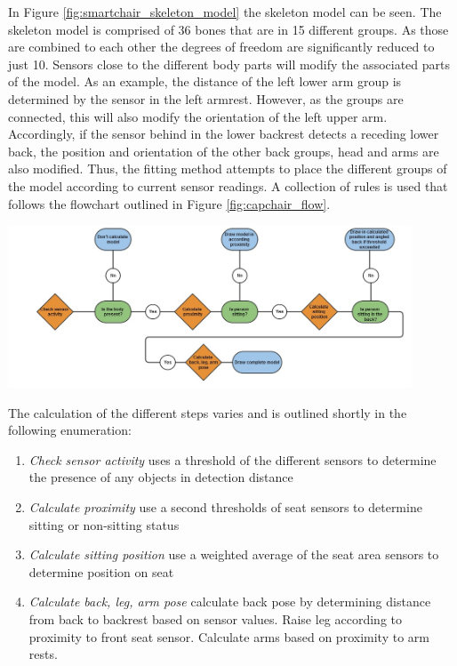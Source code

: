 In Figure \ref{fig:smartchair_skeleton_model} the skeleton model can be seen. The skeleton model is comprised of 36 bones that are in 15 different groups. As those are combined to each other the degrees of freedom are significantly reduced to just 10. Sensors close to the different body parts will modify the associated parts of the model. As an example, the distance of the left lower arm group is determined by the sensor in the left armrest. However, as the groups are connected, this will also modify the orientation of the left upper arm. Accordingly, if the sensor behind in the lower backrest detects a receding lower back, the position and orientation of the other back groups, head and arms are also modified. Thus, the fitting method attempts to place the different groups of the model according to current sensor readings. A collection of rules is used that follows the flowchart outlined in Figure \ref{fig:capchair_flow}.

\begin{minipage}{\linewidth}
\centering
\includegraphics[width=0.9\textwidth]{images/capchair_flow}
\label{fig:capchair_flow}
\end{minipage}

The calculation of the different steps varies and is outlined shortly in the following enumeration:
\begin{enumerate}
\item \emph{Check sensor activity} uses a threshold of the different sensors to determine the presence of any objects in detection distance
\item \emph{Calculate proximity} use a second thresholds of seat sensors to determine sitting or non-sitting status
\item \emph{Calculate sitting position} use a weighted average of the seat area sensors to determine position on seat
\item \emph{Calculate back, leg, arm pose} calculate back pose by determining distance from back to backrest based on sensor values. Raise leg according to proximity to front seat sensor. Calculate arms based on proximity to arm rests.
\end{enumerate}

